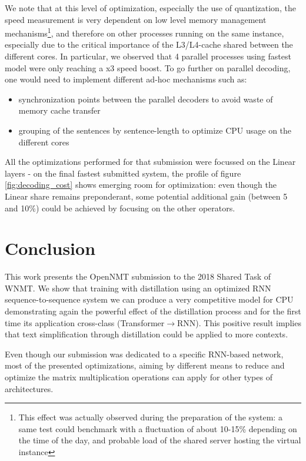 \documentclass[11pt,a4paper]{article}
\begin{document}
We  note that at this level of optimization, especially the use
of quantization, the speed measurement is very dependent on low level
memory management mechanisms\footnote{This effect was actually observed 
during the preparation of the system: a same test could benchmark with a fluctuation
of about 10-15\% depending on the time of the day, and probable load of the 
shared server hosting the virtual instance}, and therefore on other
processes running on the same instance, especially due to the critical
importance of the L3/L4-cache shared between the different cores. In
particular, we observed that 4 parallel processes using fastest model
were only reaching a x3 speed boost. To go further on parallel
decoding, one would need to implement different ad-hoc mechanisms such as:
\begin{itemize}
\item synchronization points between
the parallel decoders to avoid waste of memory cache transfer
\item grouping of the sentences by sentence-length to optimize CPU 
usage on the different cores
\end{itemize}

All the optimizations performed for that submission were focussed on the Linear layers - on the final fastest submitted system, the profile of figure \ref{fig:decoding_cost} shows emerging room for optimization: even though the Linear share remains preponderant, some potential additional gain (between 5 and 10\%) could be achieved by focusing on the other operators.

\section{Conclusion}

This work presents the OpenNMT submission to the 2018 Shared Task of
WNMT. We show that training with distillation using an optimized RNN
sequence-to-sequence system we can produce a very competitive
model for CPU demonstrating again the powerful effect of the distillation process and for the first time its application cross-class (Transformer$\rightarrow$RNN). This positive result implies that text simplification through distillation could be applied to more contexts.

Even though our submission was dedicated to a specific RNN-based network, most of the presented optimizations, aiming by different means to reduce and optimize the matrix multiplication operations can apply for other types of architectures.
\end{document}
